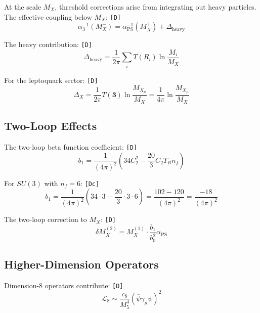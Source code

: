 \documentclass[11pt,a4paper]{article}
\newcommand{\tagD}{\textcolor{green!50!black}{\texttt{[D]}}}
\newcommand{\tagDc}{\textcolor{blue!70!black}{\texttt{[Dc]}}}
\theoremstyle{definition}
\begin{document}
At the scale $M_X$, threshold corrections arise from integrating out heavy particles.
The effective coupling below $M_X$: \tagD{}
\begin{equation}
\label{eq:threshold-matching}
\alpha_3^{-1}(M_X^-) = \alpha_{\text{PS}}^{-1}(M_X^+) + \Delta_{\text{heavy}}
\end{equation}

The heavy contribution: \tagD{}
\begin{equation}
\label{eq:delta-heavy}
\Delta_{\text{heavy}} = \frac{1}{2\pi} \sum_i T(R_i) \ln\frac{M_i}{M_X}
\end{equation}

For the leptoquark sector: \tagD{}
\begin{equation}
\label{eq:leptoquark-threshold}
\Delta_X = \frac{1}{2\pi} T(\mathbf{3}) \ln\frac{M_{X_\mu}}{M_X} = \frac{1}{4\pi} \ln\frac{M_{X_\mu}}{M_X}
\end{equation}

\subsection{Two-Loop Effects}
\label{app:two-loop}

The two-loop beta function coefficient: \tagD{}
\begin{equation}
\label{eq:b1-coefficient}
b_1 = \frac{1}{(4\pi)^2} \left(34 C_2^2 - \frac{20}{3} C_2 T_R n_f\right)
\end{equation}

For $SU(3)$ with $n_f = 6$: \tagDc{}
\begin{equation}
\label{eq:b1-numeric}
b_1 = \frac{1}{(4\pi)^2} \left(34 \cdot 3 - \frac{20}{3} \cdot 3 \cdot 6\right) = \frac{102 - 120}{(4\pi)^2} = \frac{-18}{(4\pi)^2}
\end{equation}

The two-loop correction to $M_X$: \tagD{}
\begin{equation}
\label{eq:two-loop-correction}
\delta M_X^{(2)} = M_X^{(1)} \cdot \frac{b_1}{b_0^2} \alpha_{\text{PS}}
\end{equation}

\subsection{Higher-Dimension Operators}
\label{app:higher-dim}

Dimension-8 operators contribute: \tagD{}
\begin{equation}
\label{eq:dim8-contribution}
\mathcal{L}_8 \sim \frac{c_8}{M_5^4} \left(\bar{\psi} \gamma_\mu \psi\right)^2
\end{equation}
\end{document}
